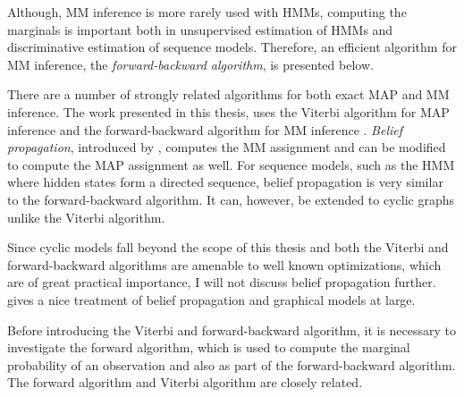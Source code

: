 Although, MM inference is more rarely used with HMMs, computing the
marginals is important both in unsupervised estimation of HMMs and
discriminative estimation of sequence models. Therefore, an efficient
algorithm for MM inference, the {\it forward-backward algorithm}, is presented below.

There are a number of strongly related algorithms for both exact MAP
and MM inference. The work presented in this thesis, uses the Viterbi
algorithm for MAP inference and the forward-backward algorithm for MM
inference \citep{Rabiner1989}. {\it Belief propagation}, introduced by
\cite{Pearl1982}, computes the MM assignment and can be modified to
compute the MAP assignment as well. For sequence models, such as the
HMM where hidden states form a directed sequence, belief propagation
is very similar to the forward-backward algorithm. It can, however, be
extended to cyclic graphs \citep{Weiss2000} unlike the Viterbi
algorithm.

Since cyclic models fall beyond the scope of this thesis and both the
Viterbi and forward-backward algorithms are amenable to well known
optimizations, which are of great practical importance, I will not
discuss belief propagation further. \cite{Koller2009} gives a nice
treatment of belief propagation and graphical models at large.

Before introducing the Viterbi and forward-backward algorithm, it is
necessary to investigate the forward algorithm, which is used to
compute the marginal probability of an observation and also as part of
the forward-backward algorithm. The forward algorithm and Viterbi
algorithm are closely related.

